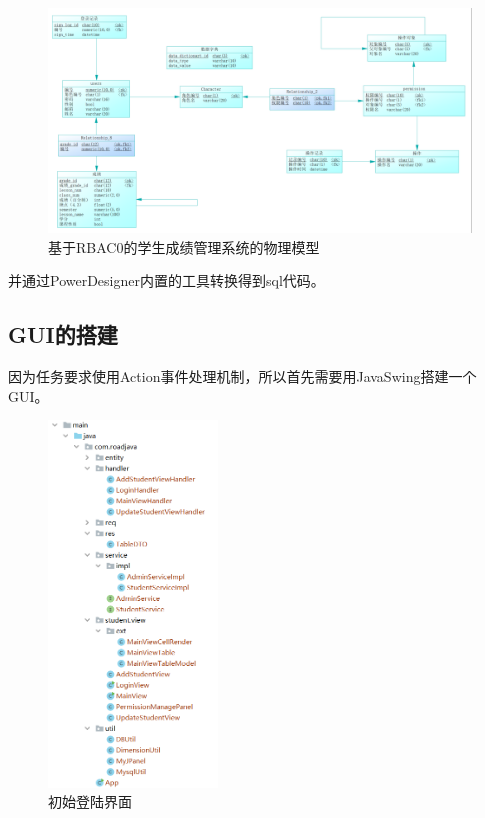 \documentclass[12pt, a4paper, oneside]{ctexart}
\begin{document}
\begin{figure}[H]
    \centering
    \includegraphics[width = 1\textwidth]{../pic/2/2.1.png}
    \caption{基于RBAC0的学生成绩管理系统的物理模型}
\end{figure}

并通过PowerDesigner内置的工具转换得到sql代码。

\subsection{GUI的搭建}

因为任务要求使用Action事件处理机制，所以首先需要用JavaSwing搭建一个GUI。

\begin{figure}[H]
    \centering
    \includegraphics[width = 0.4\textwidth]{../pic/all.png}
    \caption{初始登陆界面}
\end{figure}
\end{document}
